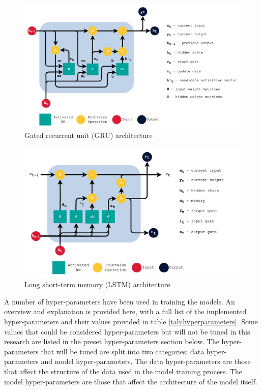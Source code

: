 \begin{figure}[H]
    \centering
    \includegraphics[scale=0.15]{figures/methodology/gru.png}
    \caption{Gated recurrent unit (GRU) architecture}
    \label{fig:gru}
\end{figure}

\begin{figure}[H]
    \centering
    \includegraphics[scale=0.15]{figures/methodology/lstm.png}
    \caption{Long short-term memory (LSTM) architecture}
    \label{fig:lstm}
\end{figure}

A number of hyper-parameters have been used in training the models. An overview and explanation is provided here, with a full list of the implemented hyper-parameters and their values provided in table \ref{tab:hyperparameters}. Some values that could be considered hyper-parameters but will not be tuned in this research are listed in the preset hyper-parameters section below. The hyper-parameters that will be tuned are split into two categories: data hyper-parameters and model hyper-parameters. The data hyper-parameters are those that affect the structure of the data used in the model training process. The model hyper-parameters are those that affect the architecture of the model itself.

